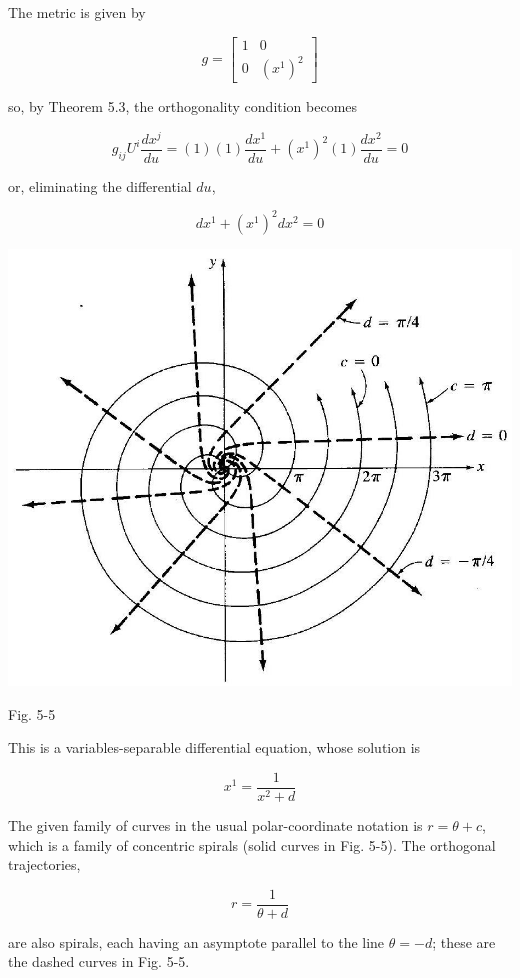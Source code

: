 \documentclass[10pt]{article}
\begin{document}
The metric is given by

$$
g=\left[\begin{array}{cc}
1 & 0 \\
0 & \left(x^{1}\right)^{2}
\end{array}\right]
$$

so, by Theorem 5.3, the orthogonality condition becomes

$$
g_{i j} U^{i} \frac{d x^{j}}{d u}=(1)(1) \frac{d x^{1}}{d u}+\left(x^{1}\right)^{2}(1) \frac{d x^{2}}{d u}=0
$$

or, eliminating the differential $d u$,

$$
d x^{1}+\left(x^{1}\right)^{2} d x^{2}=0
$$

\begin{center}
\includegraphics[max width=\textwidth]{2024_04_03_41f90be4f896e21f0dc9g-073}
\end{center}

Fig. 5-5

This is a variables-separable differential equation, whose solution is

$$
x^{1}=\frac{1}{x^{2}+d}
$$

The given family of curves in the usual polar-coordinate notation is $r=\theta+c$, which is a family of concentric spirals (solid curves in Fig. 5-5). The orthogonal trajectories,

$$
r=\frac{1}{\theta+d}
$$

are also spirals, each having an asymptote parallel to the line $\theta=-d$; these are the dashed curves in Fig. 5-5.
\end{document}
